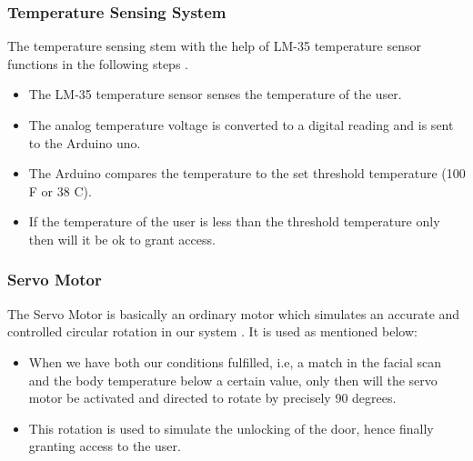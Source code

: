 \documentclass[conference]{IEEEtran}
\begin{document}
	\subsubsection{Temperature Sensing System}
	The temperature sensing
	stem with the help of LM-35 temperature sensor functions
	in the following steps \cite{i}.
	\begin{itemize}
		\item The LM-35 temperature sensor senses the
		temperature of the user.
		\item The analog temperature voltage is converted to a
		digital reading and is sent to the Arduino uno.
		\item The Arduino compares the temperature to the set
		threshold temperature (100 F or 38 C).
		\item If the temperature of the user is less than the
		threshold temperature only then will it be ok to
		grant access.\\
	\end{itemize}
	\subsubsection{Servo Motor}
	The Servo Motor is basically an ordinary motor which simulates an accurate and controlled circular rotation in our system \cite{j}. It is used as mentioned below:
	\begin{itemize}
		\item When we have both our conditions fulfilled, i.e, a match in the facial scan and the body temperature below a certain value, only then will the servo motor be activated and directed to rotate by precisely 90 degrees.
		\item This rotation is used to simulate the unlocking of the door, hence finally granting access to the user.\\\\
	\end{itemize}
	
	
\end{document}

